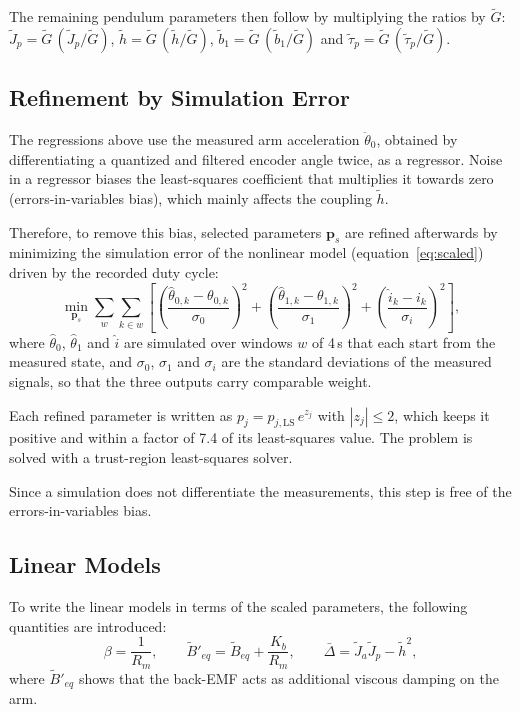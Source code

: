 \documentclass[a4paper,11pt]{article}
\begin{document}
The remaining pendulum parameters then follow by multiplying the ratios by $\tilde G$: $\tilde J_p = \tilde G\,(\tilde J_p/\tilde G)$, $\tilde h = \tilde G\,(\tilde h/\tilde G)$, $\tilde b_1 = \tilde G\,(\tilde b_1/\tilde G)$ and $\tilde\tau_p = \tilde G\,(\tilde\tau_p/\tilde G)$.

\subsection{Refinement by Simulation Error}
The regressions above use the measured arm acceleration $\ddot\theta_0$, obtained by differentiating a quantized and filtered encoder angle twice, as a regressor. Noise in a regressor biases the least-squares coefficient that multiplies it towards zero (errors-in-variables bias), which mainly affects the coupling $\tilde h$.

Therefore, to remove this bias, selected parameters $\mathbf{p}_s$ are refined afterwards by minimizing the simulation error of the nonlinear model (equation~\ref{eq:scaled}) driven by the recorded duty cycle:
\begin{equation}
  \min_{\mathbf{p}_s} \sum_{w}\sum_{k \in w} \left[\left(\frac{\hat\theta_{0,k} - \theta_{0,k}}{\sigma_{0}}\right)^2 + \left(\frac{\hat\theta_{1,k} - \theta_{1,k}}{\sigma_{1}}\right)^2 + \left(\frac{\hat i_k - i_k}{\sigma_i}\right)^2\right] ,
  \label{eq:oe}
\end{equation}
where $\hat\theta_0$, $\hat\theta_1$ and $\hat i$ are simulated over windows $w$ of 4\,s that each start from the measured state, and $\sigma_0$, $\sigma_1$ and $\sigma_i$ are the standard deviations of the measured signals, so that the three outputs carry comparable weight.

Each refined parameter is written as $p_j = p_{j,\mathrm{LS}}\, e^{z_j}$ with $|z_j| \le 2$, which keeps it positive and within a factor of 7.4 of its least-squares value. The problem is solved with a trust-region least-squares solver.

Since a simulation does not differentiate the measurements, this step is free of the errors-in-variables bias.

\subsection{Linear Models}
\label{sec:linmodels}
To write the linear models in terms of the scaled parameters, the following quantities are introduced:
\begin{equation}
  \beta = \frac{1}{R_m}, \qquad \tilde B'_{eq} = \tilde B_{eq} + \frac{K_b}{R_m}, \qquad \bar\Delta = \tilde J_a \tilde J_p - \tilde h^2 ,
  \label{eq:beta}
\end{equation}
where $\tilde B'_{eq}$ shows that the back-EMF acts as additional viscous damping on the arm.
\end{document}
